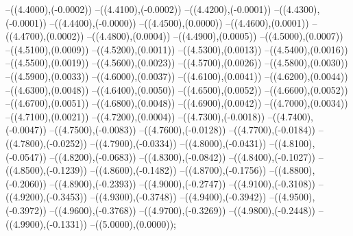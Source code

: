 {	--({\sx*(4.4000)},{\sy*(-0.0002)})
	--({\sx*(4.4100)},{\sy*(-0.0002)})
	--({\sx*(4.4200)},{\sy*(-0.0001)})
	--({\sx*(4.4300)},{\sy*(-0.0001)})
	--({\sx*(4.4400)},{\sy*(-0.0000)})
	--({\sx*(4.4500)},{\sy*(0.0000)})
	--({\sx*(4.4600)},{\sy*(0.0001)})
	--({\sx*(4.4700)},{\sy*(0.0002)})
	--({\sx*(4.4800)},{\sy*(0.0004)})
	--({\sx*(4.4900)},{\sy*(0.0005)})
	--({\sx*(4.5000)},{\sy*(0.0007)})
	--({\sx*(4.5100)},{\sy*(0.0009)})
	--({\sx*(4.5200)},{\sy*(0.0011)})
	--({\sx*(4.5300)},{\sy*(0.0013)})
	--({\sx*(4.5400)},{\sy*(0.0016)})
	--({\sx*(4.5500)},{\sy*(0.0019)})
	--({\sx*(4.5600)},{\sy*(0.0023)})
	--({\sx*(4.5700)},{\sy*(0.0026)})
	--({\sx*(4.5800)},{\sy*(0.0030)})
	--({\sx*(4.5900)},{\sy*(0.0033)})
	--({\sx*(4.6000)},{\sy*(0.0037)})
	--({\sx*(4.6100)},{\sy*(0.0041)})
	--({\sx*(4.6200)},{\sy*(0.0044)})
	--({\sx*(4.6300)},{\sy*(0.0048)})
	--({\sx*(4.6400)},{\sy*(0.0050)})
	--({\sx*(4.6500)},{\sy*(0.0052)})
	--({\sx*(4.6600)},{\sy*(0.0052)})
	--({\sx*(4.6700)},{\sy*(0.0051)})
	--({\sx*(4.6800)},{\sy*(0.0048)})
	--({\sx*(4.6900)},{\sy*(0.0042)})
	--({\sx*(4.7000)},{\sy*(0.0034)})
	--({\sx*(4.7100)},{\sy*(0.0021)})
	--({\sx*(4.7200)},{\sy*(0.0004)})
	--({\sx*(4.7300)},{\sy*(-0.0018)})
	--({\sx*(4.7400)},{\sy*(-0.0047)})
	--({\sx*(4.7500)},{\sy*(-0.0083)})
	--({\sx*(4.7600)},{\sy*(-0.0128)})
	--({\sx*(4.7700)},{\sy*(-0.0184)})
	--({\sx*(4.7800)},{\sy*(-0.0252)})
	--({\sx*(4.7900)},{\sy*(-0.0334)})
	--({\sx*(4.8000)},{\sy*(-0.0431)})
	--({\sx*(4.8100)},{\sy*(-0.0547)})
	--({\sx*(4.8200)},{\sy*(-0.0683)})
	--({\sx*(4.8300)},{\sy*(-0.0842)})
	--({\sx*(4.8400)},{\sy*(-0.1027)})
	--({\sx*(4.8500)},{\sy*(-0.1239)})
	--({\sx*(4.8600)},{\sy*(-0.1482)})
	--({\sx*(4.8700)},{\sy*(-0.1756)})
	--({\sx*(4.8800)},{\sy*(-0.2060)})
	--({\sx*(4.8900)},{\sy*(-0.2393)})
	--({\sx*(4.9000)},{\sy*(-0.2747)})
	--({\sx*(4.9100)},{\sy*(-0.3108)})
	--({\sx*(4.9200)},{\sy*(-0.3453)})
	--({\sx*(4.9300)},{\sy*(-0.3748)})
	--({\sx*(4.9400)},{\sy*(-0.3942)})
	--({\sx*(4.9500)},{\sy*(-0.3972)})
	--({\sx*(4.9600)},{\sy*(-0.3768)})
	--({\sx*(4.9700)},{\sy*(-0.3269)})
	--({\sx*(4.9800)},{\sy*(-0.2448)})
	--({\sx*(4.9900)},{\sy*(-0.1331)})
	--({\sx*(5.0000)},{\sy*(0.0000)});
}
